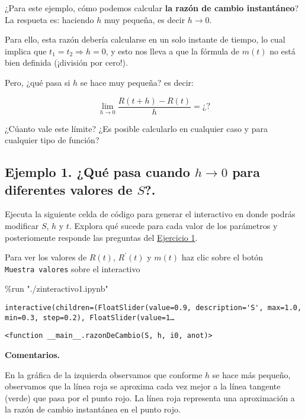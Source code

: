 \documentclass[
  letterpaper,
  DIV=11,
  numbers=noendperiod]{scrreprt}
\newenvironment{Shaded}{\begin{snugshade}}{\end{snugshade}}
\newcommand{\NormalTok}[1]{\textcolor[rgb]{0.00,0.23,0.31}{#1}}
\newcommand{\OperatorTok}[1]{\textcolor[rgb]{0.37,0.37,0.37}{#1}}
\newcommand{\StringTok}[1]{\textcolor[rgb]{0.13,0.47,0.30}{#1}}
\begin{document}
¿Para este ejemplo, cómo podemos calcular \textbf{la razón de cambio
instantáneo}? La respueta es: haciendo \(h\) muy pequeña, es decir
\(h \to 0\).

Para ello, esta razón debería calcularse en un solo instante de tiempo,
lo cual implica que \(t_1 = t_2 \Longrightarrow h = 0\), y esto nos
lleva a que la fórmula de \(m(t)\) no está bien definida (¡división por
cero!).

Pero, ¿qué pasa si \(h\) se hace muy pequeña? es decir:

\[
\lim_{h \to 0}  \frac{R(t + h) - R(t)}{h} \tag{3} = ¿?
\]

¿Cúanto vale este límite? ¿Es posible calcularlo en cualquier caso y
para cualquier tipo de función?

\subsection{\texorpdfstring{Ejemplo 1. ¿Qué pasa cuando \(h \to 0\) para
diferentes valores de
\(S\)?.}{Ejemplo 1. ¿Qué pasa cuando h \textbackslash to 0 para diferentes valores de S?.}}\label{ejemplo-1.-quuxe9-pasa-cuando-h-to-0-para-diferentes-valores-de-s.}

Ejecuta la siguiente celda de código para generar el interactivo en
donde podrás modificar \(S\), \(h\) y \(t\). Explora qué sucede para
cada valor de los parámetros y posteriomente responde las preguntas del
\hyperref[quiz-1]{Ejercicio 1}.

Para ver los valores de \(R(t)\), \(R^\prime(t)\) y \(m(t)\) haz clic
sobre el botón \texttt{Muestra\ valores} sobre el interactivo

\begin{Shaded}
\begin{Highlighting}[]
\OperatorTok{\%}\NormalTok{run }\StringTok{"./zinteractivo1.ipynb"}
\end{Highlighting}
\end{Shaded}

\begin{verbatim}
interactive(children=(FloatSlider(value=0.9, description='S', max=1.0, min=0.3, step=0.2), FloatSlider(value=1…
\end{verbatim}

\begin{verbatim}
<function __main__.razonDeCambio(S, h, i0, anot)>
\end{verbatim}

\textbf{Comentarios.}

En la gráfica de la izquierda observamos que conforme \(h\) se hace más
pequeño, observamos que la línea roja se aproxima cada vez mejor a la
línea tangente (verde) que pasa por el punto rojo. La línea roja
representa una aproximación a la razón de cambio instantánea en el punto
rojo.
\end{document}
